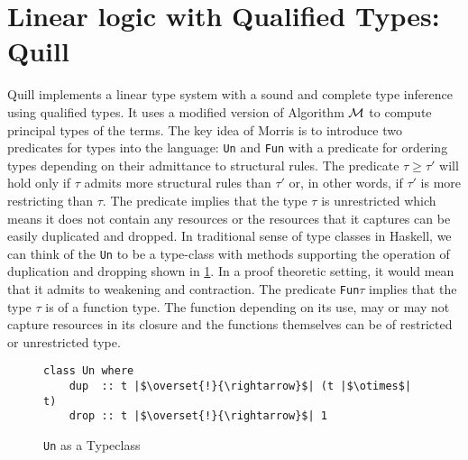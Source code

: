 \section{Linear logic with Qualified Types: Quill}\label{sec:quill}
Quill \citep{morris_best_2016} implements a linear type system with a sound and complete type inference using qualified types.
It uses a modified version of Algorithm $\mathcal{M}$ to compute principal types of the terms.
The key idea of Morris is to introduce two predicates for types into the language: \texttt{Un} and \texttt{Fun} with a predicate for ordering
types depending on their admittance to structural rules. The predicate $\tau \geq \tau'$ will hold only if $\tau$ admits more
structural rules than $\tau'$ or, in other words, if $\tau'$ is more restricting than $\tau$.
The predicate \Un{$\tau$} implies that the type $\tau$ is unrestricted which means it does not
contain any resources or the resources that it captures can be easily duplicated and dropped.
In traditional sense of type classes in Haskell, we can think of the \texttt{Un} to be a type-class with methods supporting the operation
of duplication and dropping shown in \cref{fig:un-typeclass}. In a proof theoretic setting, it would mean
that it admits to weakening and contraction. The predicate \texttt{Fun$\tau$} implies that the type $\tau$ is of a function type. The function
depending on its use, may or may not capture resources in its closure and the functions
themselves can be of restricted or unrestricted type.
\begin{figure}[h]
  \begin{framed}\centering
    \begin{verbatim}
class Un where
    dup  :: t |$\overset{!}{\rightarrow}$| (t |$\otimes$| t)
    drop :: t |$\overset{!}{\rightarrow}$| 1
    \end{verbatim}
  \end{framed}
  \caption{\texttt{Un} as a Typeclass}
  \label{fig:un-typeclass}
\end{figure}

